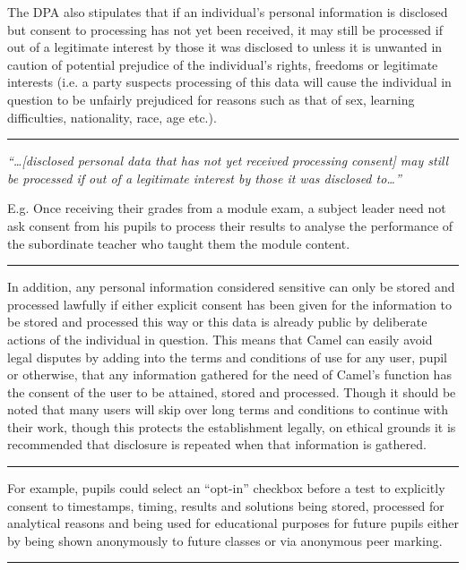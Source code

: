     The DPA also stipulates that if an individual’s personal information is disclosed but consent to processing has not yet been received, it may still be processed if out of a legitimate interest by those it was disclosed to unless it is unwanted in caution of potential prejudice of the individual’s rights, freedoms or legitimate interests\cite{DPA:tDPP:S2} (i.e. a party suspects processing of this data will cause the individual in question to be unfairly prejudiced for reasons such as that of sex, learning difficulties, nationality, race, age etc.).

	\vspace{0.35cm}
    \hrule
    {\raggedright \small \em “\ldots[disclosed personal data that has not yet received processing consent] may still be processed if out of a legitimate interest by those it was disclosed to\ldots”\par}
	{\raggedleft \scriptsize E.g. Once receiving their grades from a module exam, a subject leader need not ask consent from his pupils to process their results to analyse the performance of the subordinate teacher who taught them the module content.\par}
    \vspace{0.35cm}
    \hrule

    In addition, any personal information considered sensitive can only be stored and processed lawfully if either explicit consent has been given for the information to be stored and processed this way or this data is already public by deliberate actions of the individual in question.\cite{DPA:tDPP:S3} This means that Camel can easily avoid legal disputes by adding into the terms and conditions of use for any user, pupil or otherwise, that any information gathered for the need of Camel’s function has the consent of the user to be attained, stored and processed. Though it should be noted that many users will skip over long terms and conditions to continue with their work, though this protects the establishment legally, on ethical grounds it is recommended that disclosure is repeated when that information is gathered.

	\vspace{0.35cm}
    \hrule
    {\raggedleft \scriptsize For example, pupils could select an “opt-in” checkbox before a test to explicitly consent to timestamps, timing, results and solutions being stored, processed for analytical reasons and being used for educational purposes for future pupils either by being shown anonymously  to future classes or via anonymous peer marking.\par}
    \vspace{0.35cm}
    \hrule


